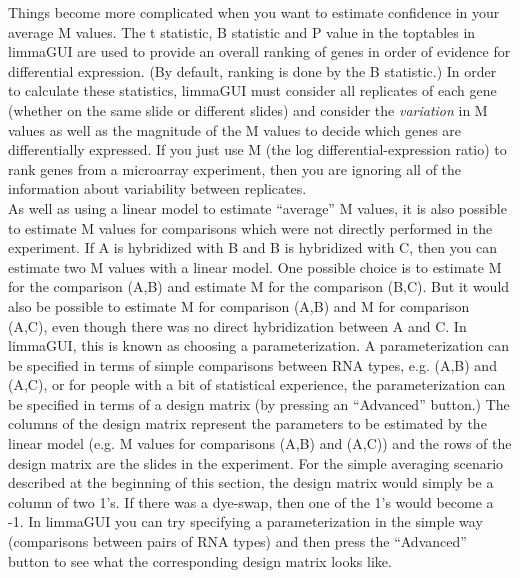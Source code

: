 \documentclass[a4paper,english,12pt]{article}
\begin{document}
Things become more complicated when you want to estimate confidence in your average M values.  The t statistic, 
B statistic and P value in the toptables in limmaGUI are used to provide an overall ranking of genes in order 
of evidence for differential expression.  (By default, ranking is done by the B statistic.)  In order to 
calculate these statistics, limmaGUI must consider all replicates of each gene (whether on the same slide or 
different slides) and consider the \emph{variation} in M values as well as the magnitude of the M values to 
decide which genes are differentially expressed.  If you just use M (the log differential-expression ratio) 
to rank genes from a microarray experiment, then you are ignoring all of the information about variability 
between replicates.\\


As well as using a linear model to estimate ``average'' M values, it is also possible to estimate M values for 
comparisons which were not directly performed in the experiment.  If A is hybridized with B and
B is hybridized with C, then you can estimate two M values with a linear model.  One possible choice is to
estimate M for the comparison (A,B) and estimate M for the comparison (B,C).  But it would also be possible
to estimate M for comparison (A,B) and M for comparison (A,C), even though there was no direct hybridization
between A and C.  In limmaGUI, this is known as choosing a parameterization.  A parameterization can be
specified in terms of simple comparisons between RNA types, e.g. (A,B) and (A,C), or for people with a bit of
statistical experience, the parameterization can be specified in terms of a design matrix (by pressing an
``Advanced'' button.)  The columns of the design matrix represent the parameters to be estimated by the 
linear model (e.g. M values for comparisons (A,B) and (A,C)) and
the rows of the design matrix are the slides in the experiment.  For the simple averaging scenario described
at the beginning of this section, the design matrix would simply be a column of two 1's.  If there was a
dye-swap, then one of the 1's would become a -1.  In limmaGUI you can try specifying a parameterization in the 
simple way (comparisons between pairs of RNA types) and then press the ``Advanced'' button to see what the
corresponding design matrix looks like.
\end{document}
